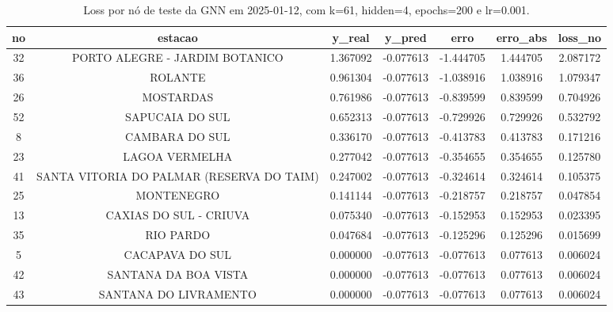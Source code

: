 \begin{table}[h]
\centering
\caption{Loss por nó de teste da GNN em 2025-01-12, com k=61, hidden=4, epochs=200 e lr=0.001.}
\label{tab:gnn_loss_nodes_k61_hidden4}
\begin{tabular}{ccccccc}
\toprule
no & estacao & y\_real & y\_pred & erro & erro\_abs & loss\_no \\
\midrule
32 & PORTO ALEGRE - JARDIM BOTANICO & 1.367092 & -0.077613 & -1.444705 & 1.444705 & 2.087172 \\
36 & ROLANTE & 0.961304 & -0.077613 & -1.038916 & 1.038916 & 1.079347 \\
26 & MOSTARDAS & 0.761986 & -0.077613 & -0.839599 & 0.839599 & 0.704926 \\
52 & SAPUCAIA DO SUL & 0.652313 & -0.077613 & -0.729926 & 0.729926 & 0.532792 \\
8 & CAMBARA DO SUL & 0.336170 & -0.077613 & -0.413783 & 0.413783 & 0.171216 \\
23 & LAGOA VERMELHA & 0.277042 & -0.077613 & -0.354655 & 0.354655 & 0.125780 \\
41 & SANTA VITORIA DO PALMAR (RESERVA DO TAIM) & 0.247002 & -0.077613 & -0.324614 & 0.324614 & 0.105375 \\
25 & MONTENEGRO & 0.141144 & -0.077613 & -0.218757 & 0.218757 & 0.047854 \\
13 & CAXIAS DO SUL - CRIUVA & 0.075340 & -0.077613 & -0.152953 & 0.152953 & 0.023395 \\
35 & RIO PARDO & 0.047684 & -0.077613 & -0.125296 & 0.125296 & 0.015699 \\
5 & CACAPAVA DO SUL & 0.000000 & -0.077613 & -0.077613 & 0.077613 & 0.006024 \\
42 & SANTANA DA BOA VISTA & 0.000000 & -0.077613 & -0.077613 & 0.077613 & 0.006024 \\
43 & SANTANA DO LIVRAMENTO & 0.000000 & -0.077613 & -0.077613 & 0.077613 & 0.006024 \\
\bottomrule
\end{tabular}
\end{table}
